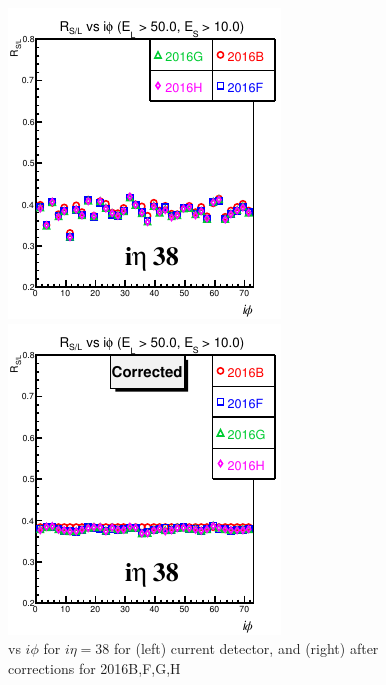 \begin{figure}[!h] %
\begin{minipage}[c]{0.5\linewidth}
\centering
\includegraphics[width=0.7\linewidth]{../Figures/Chap2/ImageFiles_HF/Ratio/2016/Corrected/ieta38Cut3Ietaiphi.pdf}
\end{minipage}
\begin{minipage}[c]{0.5\linewidth}
\centering
\includegraphics[width=0.7\linewidth]{../Figures/Chap2/ImageFiles_HF/Ratio/2016/Corrected/ieta38Cut3Ietaiphi_corr.pdf}
\end{minipage}
\caption[\ratiosl vs $i\phi$ for $i\eta=38$ before and after corrections]{\ratiosl vs $i\phi$ for $i\eta=38$ for (left) current detector, and (right) after corrections for 2016B,F,G,H}
\label{corrected2016BFGH_38}
\end{figure}
